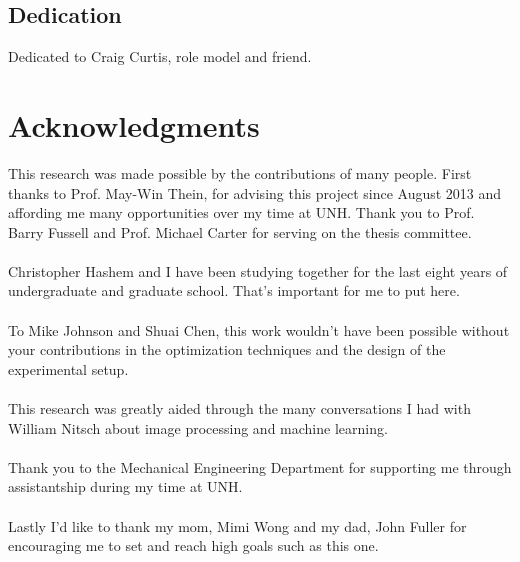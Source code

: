 \documentclass[12pt,a4paper]{book}
\begin{document}
\newpage
\begin{center}
\section*{Dedication}
\vspace{8cm}
Dedicated to Craig Curtis, role model and friend.
\clearpage
\end{center}
\section*{Acknowledgments}
This research was made possible by the contributions of many people. First thanks to Prof. May-Win Thein, for advising this project since August 2013 and affording me many opportunities over my time at UNH.  Thank you to Prof. Barry Fussell and Prof. Michael Carter for serving on the thesis committee. \\ \\
Christopher Hashem and I have been studying together for the last eight years of undergraduate and graduate school.  That's important for me to put here.  \\\\
To Mike Johnson and Shuai Chen, this work wouldn't have been possible without your contributions in the optimization techniques and the design of the experimental setup.\\\\
This research was greatly aided through the many conversations I had with William Nitsch about image processing and machine learning. \\\\
Thank you to the Mechanical Engineering Department for supporting me through assistantship during my time at UNH.\\\\
Lastly I'd like to thank my mom, Mimi Wong and my dad, John Fuller for encouraging me to set and reach high goals such as this one.
\end{document}
